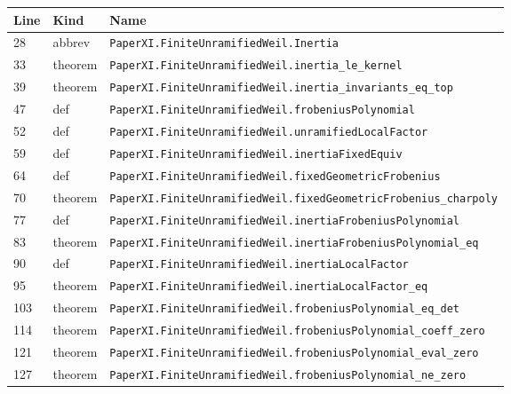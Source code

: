 \documentclass[10pt,oneside]{book}
\begin{document}
\begin{longtable}{@{}p{}p{}p{}@{}}\toprule Line&Kind&Name\\\midrule\endhead

28&abbrev&\nolinkurl{PaperXI.FiniteUnramifiedWeil.Inertia}\\

33&theorem&\nolinkurl{PaperXI.FiniteUnramifiedWeil.inertia_le_kernel}\\

39&theorem&\nolinkurl{PaperXI.FiniteUnramifiedWeil.inertia_invariants_eq_top}\\

47&def&\nolinkurl{PaperXI.FiniteUnramifiedWeil.frobeniusPolynomial}\\

52&def&\nolinkurl{PaperXI.FiniteUnramifiedWeil.unramifiedLocalFactor}\\

59&def&\nolinkurl{PaperXI.FiniteUnramifiedWeil.inertiaFixedEquiv}\\

64&def&\nolinkurl{PaperXI.FiniteUnramifiedWeil.fixedGeometricFrobenius}\\

70&theorem&\nolinkurl{PaperXI.FiniteUnramifiedWeil.fixedGeometricFrobenius_charpoly}\\

77&def&\nolinkurl{PaperXI.FiniteUnramifiedWeil.inertiaFrobeniusPolynomial}\\

83&theorem&\nolinkurl{PaperXI.FiniteUnramifiedWeil.inertiaFrobeniusPolynomial_eq}\\

90&def&\nolinkurl{PaperXI.FiniteUnramifiedWeil.inertiaLocalFactor}\\

95&theorem&\nolinkurl{PaperXI.FiniteUnramifiedWeil.inertiaLocalFactor_eq}\\

103&theorem&\nolinkurl{PaperXI.FiniteUnramifiedWeil.frobeniusPolynomial_eq_det}\\

114&theorem&\nolinkurl{PaperXI.FiniteUnramifiedWeil.frobeniusPolynomial_coeff_zero}\\

121&theorem&\nolinkurl{PaperXI.FiniteUnramifiedWeil.frobeniusPolynomial_eval_zero}\\

127&theorem&\nolinkurl{PaperXI.FiniteUnramifiedWeil.frobeniusPolynomial_ne_zero}\\


\end{longtable}
\end{document}

